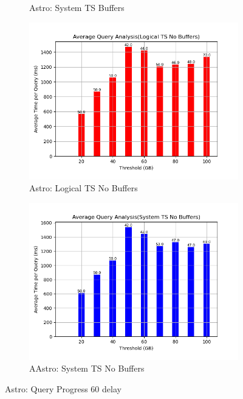 \begin{figure}
\begin{subfigure}[c]{0.45\textwidth}
		\caption{Astro: System TS Buffers}
		\label{fig:system-ts-60-astro}
	\end{subfigure}
	\begin{subfigure}[c]{0.45\textwidth}
		\includegraphics[width=1\textwidth]	 {figures/Experiments/Dynamic/ASTRO/Batch_processing/60/average_query_time_per_batch_version_999777016_10485760_10_delay[60].png}
		\caption{Astro: Logical TS No Buffers}
		\label{fig:logical-ts-no-60-astro}
	\end{subfigure}
	\begin{subfigure}[c]{0.45\textwidth}
		\includegraphics[width=1\textwidth]	 {figures/Experiments/Dynamic/ASTRO/Batch_processing/60/average_query_time_per_batch_version_999777017_10485760_10_delay[60].png}
		\caption{AAstro: System TS No Buffers}
		\label{fig:system-ts-no-60-astro}
	\end{subfigure}
	\caption{Astro: Query Progress 60 delay}
	\label{fig:query-progress-60-astro}
\end{figure}
